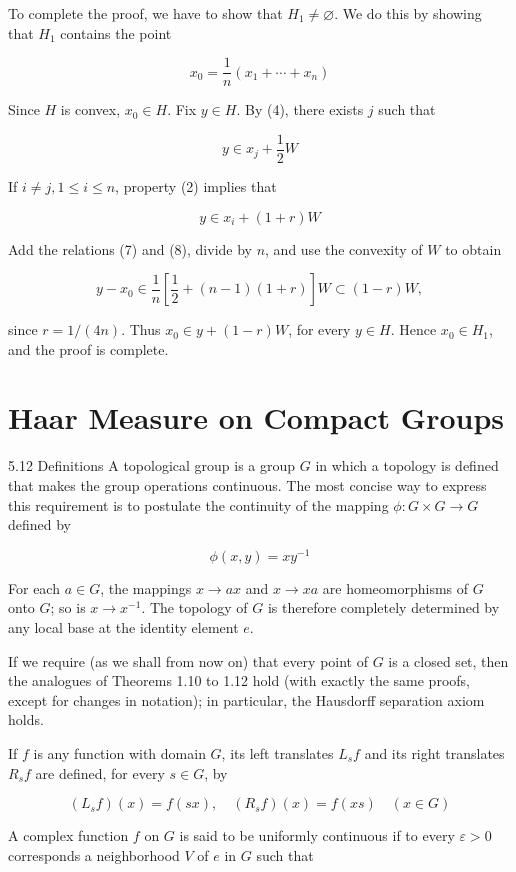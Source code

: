 \documentclass[10pt]{article}
\begin{document}
To complete the proof, we have to show that $H_{1} \neq \varnothing$. We do this by showing that $H_{1}$ contains the point

$$
x_{0}=\frac{1}{n}\left(x_{1}+\cdots+x_{n}\right)
$$

Since $H$ is convex, $x_{0} \in H$. Fix $y \in H$. By (4), there exists $j$ such that

$$
y \in x_{j}+\frac{1}{2} W
$$

If $i \neq j, 1 \leq i \leq n$, property (2) implies that

$$
y \in x_{i}+(1+r) W
$$

Add the relations (7) and (8), divide by $n$, and use the convexity of $W$ to obtain

$$
y-x_{0} \in \frac{1}{n}\left[\frac{1}{2}+(n-1)(1+r)\right] W \subset(1-r) W,
$$

since $r=1 /(4 n)$. Thus $x_{0} \in y+(1-r) W$, for every $y \in H$. Hence $x_{0} \in H_{1}$, and the proof is complete.

\section{Haar Measure on Compact Groups}
5.12 Definitions A topological group is a group $G$ in which a topology is defined that makes the group operations continuous. The most concise way to express this requirement is to postulate the continuity of the mapping $\phi: G \times G \rightarrow G$ defined by

$$
\phi(x, y)=x y^{-1}
$$

For each $a \in G$, the mappings $x \rightarrow a x$ and $x \rightarrow x a$ are homeomorphisms of $G$ onto $G$; so is $x \rightarrow x^{-1}$. The topology of $G$ is therefore completely determined by any local base at the identity element $e$.

If we require (as we shall from now on) that every point of $G$ is a closed set, then the analogues of Theorems 1.10 to 1.12 hold (with exactly the same proofs, except for changes in notation); in particular, the Hausdorff separation axiom holds.

If $f$ is any function with domain $G$, its left translates $L_{s} f$ and its right translates $R_{s} f$ are defined, for every $s \in G$, by

$$
\left(L_{s} f\right)(x)=f(s x), \quad\left(R_{s} f\right)(x)=f(x s) \quad(x \in G)
$$

A complex function $f$ on $G$ is said to be uniformly continuous if to every $\varepsilon>0$ corresponds a neighborhood $V$ of $e$ in $G$ such that
\end{document}
